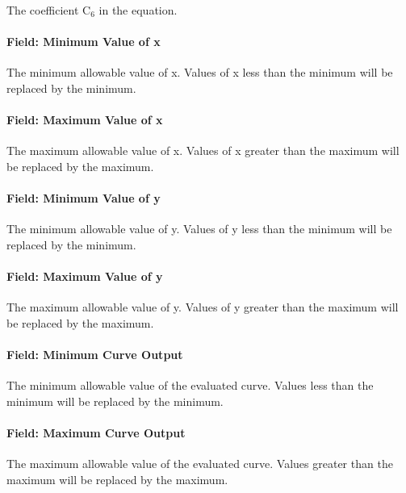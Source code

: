 The coefficient C\(_{6}\) in the equation.

\paragraph{Field: Minimum Value of x}\label{field-minimum-value-of-x-10}

The minimum allowable value of x. Values of x less than the minimum will be replaced by the minimum.

\paragraph{Field: Maximum Value of x}\label{field-maximum-value-of-x-11}

The maximum allowable value of x. Values of x greater than the maximum will be replaced by the maximum.

\paragraph{Field: Minimum Value of y}\label{field-minimum-value-of-y-5}

The minimum allowable value of y. Values of y less than the minimum will be replaced by the minimum.

\paragraph{Field: Maximum Value of y}\label{field-maximum-value-of-y-5}

The maximum allowable value of y. Values of y greater than the maximum will be replaced by the maximum.

\paragraph{Field: Minimum Curve Output}\label{field-minimum-curve-output-9}

The minimum allowable value of the evaluated curve. Values less than the minimum will be replaced by the minimum.

\paragraph{Field: Maximum Curve Output}\label{field-maximum-curve-output-8}

The maximum allowable value of the evaluated curve. Values greater than the maximum will be replaced by the maximum.


